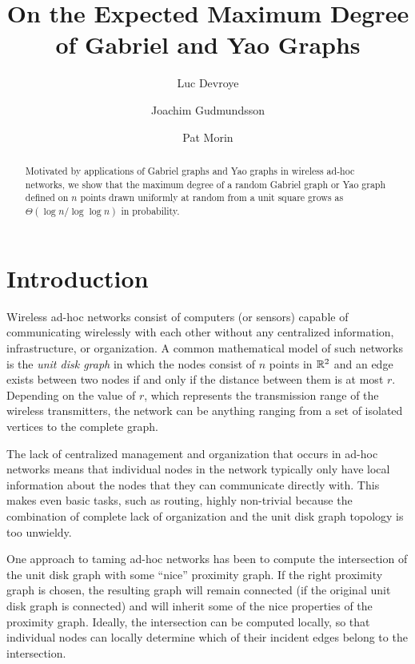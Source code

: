 \documentclass[10pt]{llncs}
\title{On the Expected Maximum Degree \\ of Gabriel and Yao Graphs}
\author{Luc Devroye%
	\and Joachim Gudmundsson%
	\and Pat Morin%
}
\institute{McGill University, NICTA, and Carleton University}
\begin{document}
\maketitle
\begin{abstract}
Motivated by applications of Gabriel graphs and Yao graphs in wireless
ad-hoc networks, we show that the maximum degree of a random Gabriel
graph or Yao graph defined on $n$ points drawn uniformly at random from
a unit square  grows as $\Theta ( \log n / \log \log n)$ in probability.
\end{abstract}


%


\section{Introduction}

Wireless ad-hoc networks consist of computers (or sensors) capable of
communicating wirelessly with each other without any centralized
information, infrastructure, or organization.  A common mathematical model
of such networks is the \emph{unit disk graph} in which the nodes consist
of $n$ points in $\mathbb{R}^2$ and an edge exists between two nodes if and only if
the distance between them is at most $r$.  Depending on the value of $r$,
which represents the transmission range of the wireless transmitters, the
network can be anything ranging from a set of isolated vertices to the
complete graph.

The lack of centralized management and organization that occurs in ad-hoc
networks means that individual nodes in the network typically only have
local information about the nodes that they can communicate directly with.
This makes even basic tasks, such as routing, highly non-trivial because
the combination of complete lack of organization and the unit disk graph
topology is too unwieldy.

One approach to taming ad-hoc networks has been to compute the
intersection of the unit disk graph with some ``nice'' proximity graph.
If the right proximity graph is chosen, the resulting graph will
remain connected (if the original unit disk graph is connected) and will
inherit some of the nice properties of the proximity graph.   Ideally, the
intersection can be computed locally, so that individual nodes can locally
determine which of their incident edges belong to the intersection.
\end{document}
